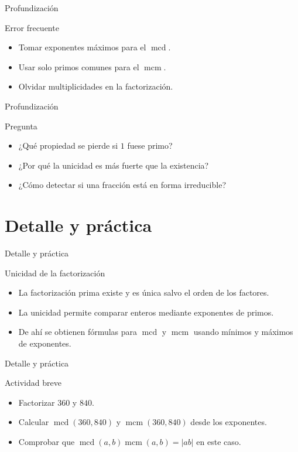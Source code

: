 \documentclass[aspectratio=169,11pt]{beamer}
\newcommand{\mcd}{\operatorname{mcd}}
\newcommand{\mcm}{\operatorname{mcm}}
\begin{document}
\begin{frame}{Profundización}
\begin{block}{Error frecuente}
\begin{itemize}
  \item Tomar exponentes máximos para el \(\mcd\).
  \item Usar solo primos comunes para el \(\mcm\).
  \item Olvidar multiplicidades en la factorización.
\end{itemize}
\end{block}
\end{frame}

\begin{frame}{Profundización}
\begin{block}{Pregunta}
\begin{itemize}
  \item ¿Qué propiedad se pierde si \(1\) fuese primo?
  \item ¿Por qué la unicidad es más fuerte que la existencia?
  \item ¿Cómo detectar si una fracción está en forma irreducible?
\end{itemize}
\end{block}
\end{frame}


\section{Detalle y práctica}

\begin{frame}{Detalle y práctica}
\begin{block}{Unicidad de la factorización}
\begin{itemize}
  \item La factorización prima existe y es única salvo el orden de los factores.
  \item La unicidad permite comparar enteros mediante exponentes de primos.
  \item De ahí se obtienen fórmulas para \(\mcd\) y \(\mcm\) usando mínimos y máximos de exponentes.
\end{itemize}
\end{block}
\end{frame}

\begin{frame}{Detalle y práctica}
\begin{block}{Actividad breve}
\begin{itemize}
  \item Factorizar \(360\) y \(840\).
  \item Calcular \(\mcd(360,840)\) y \(\mcm(360,840)\) desde los exponentes.
  \item Comprobar que \(\mcd(a,b)\mcm(a,b)=|ab|\) en este caso.
\end{itemize}
\end{block}
\end{frame}
\end{document}
